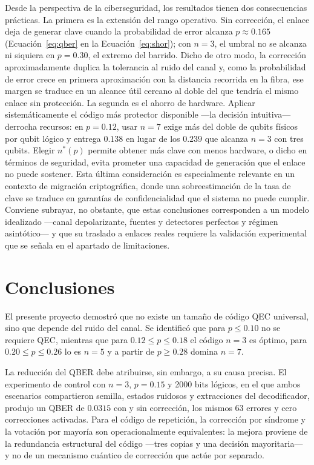 \documentclass[12pt]{report}
\begin{document}
Desde la perspectiva de la ciberseguridad, los resultados tienen dos
consecuencias prácticas. La primera es la extensión del rango operativo. Sin
corrección, el enlace deja de generar clave cuando la probabilidad de error
alcanza \(p \approx 0.165\) (Ecuación~\eqref{eq:qber} en la
Ecuación~\eqref{eq:shor}); con \(n=3\), el umbral no se alcanza ni siquiera en
\(p=0.30\), el extremo del barrido. Dicho de otro modo, la corrección
aproximadamente duplica la tolerancia al ruido del canal y, como la probabilidad
de error crece en primera aproximación con la distancia recorrida en la fibra,
ese margen se traduce en un alcance útil cercano al doble del que tendría el
mismo enlace sin protección. La segunda es el ahorro de hardware. Aplicar
sistemáticamente el código más protector disponible —la decisión intuitiva—
derrocha recursos: en \(p=0.12\), usar \(n=7\) exige más del doble de qubits
físicos por qubit lógico y entrega \(0.138\) en lugar de los \(0.239\) que
alcanza \(n=3\) con tres qubits. Elegir \(n^{*}(p)\) permite obtener más clave con
menos hardware, o dicho en términos de seguridad, evita prometer una capacidad de
generación que el enlace no puede sostener. Esta última consideración es
especialmente relevante en un contexto de migración criptográfica, donde una
sobreestimación de la tasa de clave se traduce en garantías de confidencialidad
que el sistema no puede cumplir. Conviene subrayar, no obstante, que estas
conclusiones corresponden a un modelo idealizado —canal depolarizante, fuentes y
detectores perfectos y régimen asintótico— y que su traslado a enlaces reales
requiere la validación experimental que se señala en el apartado de limitaciones.

\section{Conclusiones}

El presente proyecto demostró que no existe un tamaño de código QEC universal,
sino que depende del ruido del canal. Se identificó que para \(p \le 0.10\) no se
requiere QEC, mientras que para \(0.12 \le p \le 0.18\) el código \(n=3\) es
óptimo, para \(0.20 \le p \le 0.26\) lo es \(n=5\) y a partir de \(p \ge 0.28\)
domina \(n=7\).

La reducción del QBER debe atribuirse, sin embargo, a su causa precisa. El
experimento de control con \(n=3\), \(p=0.15\) y 2000 bits lógicos, en el que
ambos escenarios compartieron semilla, estados ruidosos y extracciones del
decodificador, produjo un QBER de \(0.0315\) con y sin corrección, los mismos 63
errores y cero correcciones activadas. Para el código de repetición, la
corrección por síndrome y la votación por mayoría son operacionalmente
equivalentes: la mejora proviene de la redundancia estructural del código —tres
copias y una decisión mayoritaria— y no de un mecanismo cuántico de corrección
que actúe por separado.
\end{document}
